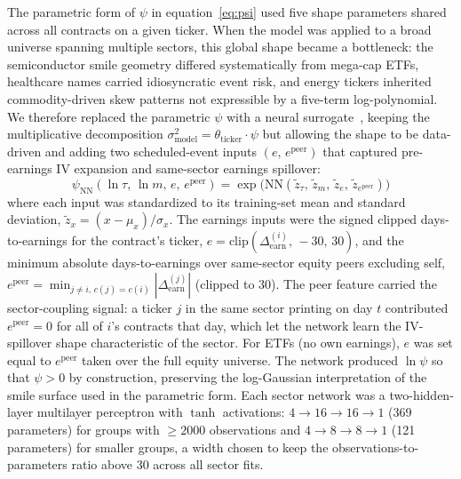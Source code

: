 The parametric form of $\psi$ in equation~\eqref{eq:psi} used five shape parameters shared across all contracts on a given ticker. When the model was applied to a broad universe spanning multiple sectors, this global shape became a bottleneck: the semiconductor smile geometry differed systematically from mega-cap ETFs, healthcare names carried idiosyncratic event risk, and energy tickers inherited commodity-driven skew patterns not expressible by a five-term log-polynomial. We therefore replaced the parametric $\psi$ with a neural surrogate~\cite{horvath2021}, keeping the multiplicative decomposition $\sigma_{\text{model}}^2 = \theta_{\text{ticker}} \cdot \psi$ but allowing the shape to be data-driven and adding two scheduled-event inputs $(e,\,e^{\text{peer}})$ that captured pre-earnings IV expansion and same-sector earnings spillover:
\begin{equation}\label{eq:psi_nn}
    \psi_{\text{NN}}(\ln\tau,\,\ln m,\,e,\,e^{\text{peer}}) = \exp\!\bigl(\mathrm{NN}(\tilde z_\tau,\,\tilde z_m,\,\tilde z_e,\,\tilde z_{e^{\text{peer}}})\bigr)
\end{equation}
where each input was standardized to its training-set mean and standard deviation, $\tilde z_x = (x - \mu_x)/\sigma_x$. The earnings inputs were the signed clipped days-to-earnings for the contract's ticker, $e = \mathrm{clip}(\Delta_{\text{earn}}^{(i)},\,-30,\,30)$, and the minimum absolute days-to-earnings over same-sector equity peers excluding self, $e^{\text{peer}} = \min_{j \neq i,\, c(j)=c(i)} |\Delta_{\text{earn}}^{(j)}|$ (clipped to 30). The peer feature carried the sector-coupling signal: a ticker $j$ in the same sector printing on day $t$ contributed $e^{\text{peer}} = 0$ for all of $i$'s contracts that day, which let the network learn the IV-spillover shape characteristic of the sector. For ETFs (no own earnings), $e$ was set equal to $e^{\text{peer}}$ taken over the full equity universe. The network produced $\ln\psi$ so that $\psi > 0$ by construction, preserving the log-Gaussian interpretation of the smile surface used in the parametric form. Each sector network was a two-hidden-layer multilayer perceptron with $\tanh$ activations: $4 \to 16 \to 16 \to 1$ (369 parameters) for groups with $\geq 2000$ observations and $4 \to 8 \to 8 \to 1$ (121 parameters) for smaller groups, a width chosen to keep the observations-to-parameters ratio above 30 across all sector fits.


